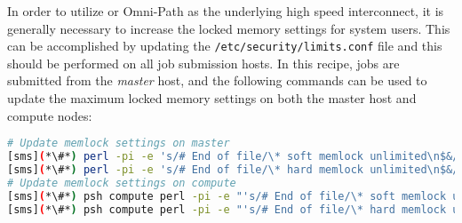 In order to utilize \InfiniBand{} or Omni-Path as the underlying high speed interconnect, it is
generally necessary to increase the locked memory settings for system
users. This can be accomplished by updating
the \texttt{/etc/security/limits.conf} file and this should be performed
on all job submission hosts. In this recipe, jobs
are submitted from the {\em master} host, and the following commands can be
used to update the maximum locked memory settings on both the master host and
compute nodes:

\begin{lstlisting}[language=bash,keywords={},upquote=true]
# Update memlock settings on master
[sms](*\#*) perl -pi -e 's/# End of file/\* soft memlock unlimited\n$&/s' /etc/security/limits.conf
[sms](*\#*) perl -pi -e 's/# End of file/\* hard memlock unlimited\n$&/s' /etc/security/limits.conf
# Update memlock settings on compute
[sms](*\#*) psh compute perl -pi -e "'s/# End of file/\* soft memlock unlimited\n$&/s' /etc/security/limits.conf"
[sms](*\#*) psh compute perl -pi -e "'s/# End of file/\* hard memlock unlimited\n$&/s' /etc/security/limits.conf"
\end{lstlisting}


